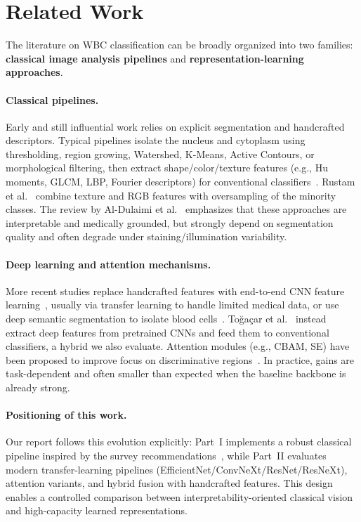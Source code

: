 \documentclass[twocolumn,a4paper]{article}
\begin{document}
\section{Related Work}

The literature on WBC classification can be broadly organized into two families: \textbf{classical image analysis pipelines} and \textbf{representation-learning approaches}.

\paragraph{Classical pipelines.}
Early and still influential work relies on explicit segmentation and handcrafted descriptors. Typical pipelines isolate the nucleus and cytoplasm using thresholding, region growing, Watershed, K-Means, Active Contours, or morphological filtering, then extract shape/color/texture features (e.g., Hu moments, GLCM, LBP, Fourier descriptors) for conventional classifiers~\cite{rezatofighi2011, gautam2014, ghosh2010}. Rustam et al.~\cite{rustam2022} combine texture and RGB features with oversampling of the minority classes. The review by Al-Dulaimi et al.~\cite{aldulaimi2018} emphasizes that these approaches are interpretable and medically grounded, but strongly depend on segmentation quality and often degrade under staining/illumination variability.

\paragraph{Deep learning and attention mechanisms.}
More recent studies replace handcrafted features with end-to-end CNN feature learning~\cite{qin2018}, usually via transfer learning to handle limited medical data, or use deep semantic segmentation to isolate blood cells~\cite{tran2018}. To\u{g}a\c{c}ar et al.~\cite{togacar2020} instead extract deep features from pretrained CNNs and feed them to conventional classifiers, a hybrid we also evaluate. Attention modules (e.g., CBAM, SE) have been proposed to improve focus on discriminative regions~\cite{woo2018cbam, hu2018squeeze}. In practice, gains are task-dependent and often smaller than expected when the baseline backbone is already strong.

\paragraph{Positioning of this work.}
Our report follows this evolution explicitly: Part~I implements a robust classical pipeline inspired by the survey recommendations~\cite{aldulaimi2018}, while Part~II evaluates modern transfer-learning pipelines (EfficientNet/ConvNeXt/ResNet/ResNeXt), attention variants, and hybrid fusion with handcrafted features. This design enables a controlled comparison between interpretability-oriented classical vision and high-capacity learned representations.
\end{document}
